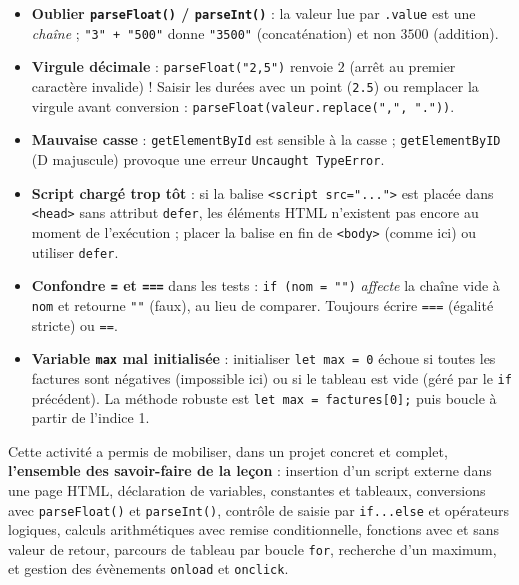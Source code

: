 \documentclass[11pt]{article}
\newcounter{popsec}
\newcounter{popsub}
\newcommand{\courssub}[1]{%
  \stepcounter{popsub}%
  \par\vspace{9pt}\noindent{\popxbold\fontsize{11.5}{13}\selectfont\color{popink}{\color{poporange}\thepopsec.\thepopsub}\hspace{6pt}#1}\par\nopagebreak\vspace{4pt}
}
\begin{document}
\begin{attention}
\begin{itemize}
\item \textbf{Oublier \texttt{parseFloat()} / \texttt{parseInt()}} : la valeur lue par \texttt{.value} est une \emph{chaîne} ; \texttt{"3" + "500"} donne \texttt{"3500"} (concaténation) et non $3500$ (addition).
\item \textbf{Virgule décimale} : \texttt{parseFloat("2,5")} renvoie $2$ (arrêt au premier caractère invalide) ! Saisir les durées avec un point (\texttt{2.5}) ou remplacer la virgule avant conversion : \texttt{parseFloat(valeur.replace(",", "."))}.
\item \textbf{Mauvaise casse} : \texttt{getElementById} est sensible à la casse ; \texttt{getElementByID} (D majuscule) provoque une erreur \texttt{Uncaught TypeError}.
\item \textbf{Script chargé trop tôt} : si la balise \texttt{<script src="...">} est placée dans \texttt{<head>} sans attribut \texttt{defer}, les éléments HTML n'existent pas encore au moment de l'exécution ; placer la balise en fin de \texttt{<body>} (comme ici) ou utiliser \texttt{defer}.
\item \textbf{Confondre \texttt{=} et \texttt{===}} dans les tests : \texttt{if (nom = "")} \emph{affecte} la chaîne vide à \texttt{nom} et retourne \texttt{""} (faux), au lieu de comparer. Toujours écrire \texttt{===} (égalité stricte) ou \texttt{==}.
\item \textbf{Variable \texttt{max} mal initialisée} : initialiser \texttt{let max = 0} échoue si toutes les factures sont négatives (impossible ici) ou si le tableau est vide (géré par le \texttt{if} précédent). La méthode robuste est \texttt{let max = factures[0];} puis boucle à partir de l'indice 1.
\end{itemize}
\end{attention}

\courssub{Bilan de l'activité}

Cette activité a permis de mobiliser, dans un projet concret et complet, \textbf{l'ensemble des savoir-faire de la leçon} : insertion d'un script externe dans une page HTML, déclaration de variables, constantes et tableaux, conversions avec \texttt{parseFloat()} et \texttt{parseInt()}, contrôle de saisie par \texttt{if...else} et opérateurs logiques, calculs arithmétiques avec remise conditionnelle, fonctions avec et sans valeur de retour, parcours de tableau par boucle \texttt{for}, recherche d'un maximum, et gestion des évènements \texttt{onload} et \texttt{onclick}.
\end{document}
